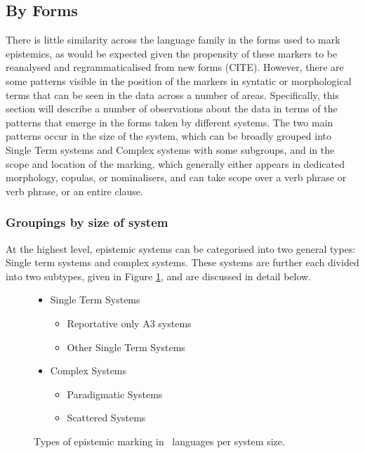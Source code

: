 \subsection{By Forms}\label{ss:Description:ClassBySystem}
There is little similarity across the language family in the forms used to mark epistemics, as would be expected given the propensity of these markers to be reanalysed and regrammaticalised from new forms (CITE). However, there are some patterns visible in the position of the markers in syntatic or morphological terms that can be seen in the data across a number of areas. Specifically, this section will describe a number of observations about the data in terms of the patterns that emerge in the forms taken by different systems. The two main patterns occur in the size of the system, which can be broadly grouped into Single Term systems and Complex systems with some subgroups, and in the scope and location of the marking, which generally either appears in dedicated morphology, copulas, or nominalisers, and can take scope over a verb phrase or verb phrase, or an entire clause.
\subsubsection{Groupings by size of system}\label{sss:Description:GroupSize}
At the highest level, epistemic systems can be categorised into two general types: Single term systems and complex systems. These systems are further each divided into two subtypes, given in Figure \ref{f:Description:SizeTypes}, and are discussed in detail below.

\begin{figure}
        \begin{itemize}
                \item Single Term Systems
                \begin{itemize}
                        \item Reportative only A3 systems
                        \item Other Single Term Systems
                \end{itemize}
                \item Complex Systems
                \begin{itemize}
                        \item Paradigmatic Systems
                        \item Scattered Systems
                \end{itemize}
        \end{itemize}
        \caption{Types of epistemic marking in \lfam\ languages per system size.}\label{f:Description:SizeTypes}
\end{figure}

